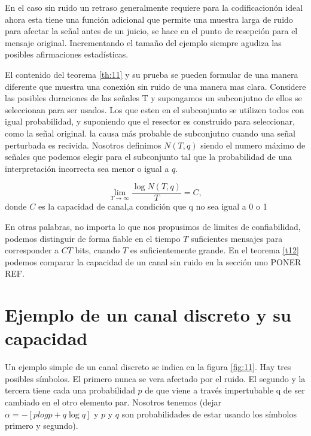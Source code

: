En el caso sin ruido un retraso generalmente requiere para la
codificacion\'on ideal ahora esta tiene una funci\'on adicional que
permite una muestra larga de ruido para afectar la se\~{n}al antes de
un juicio, se hace en el punto de resepci\'on para el mensaje
original. Incrementando el tama\~{n}o del ejemplo siempre agudiza las
posibles afirmaciones estad\'isticas.

El contenido del teorema \ref{th:11} y su prueba se pueden formular de
una manera diferente que muestra una conexi\'on sin ruido de una
manera mas clara. Considere las posibles duraciones de las se\~{n}ales
T y supongamos un subconjutno de ellos se seleccionan para ser
usados. Los que esten en el subconjunto se utilizen todos con igual
probabilidad, y suponiendo que el resector es construido para
seleccionar, como la se\~{n}al original. la causa m\'as probable de
subconjutno cuando una se\~{n}al perturbada es recivida. Nosotros
definimos $N(T,q)$ siendo el numero m\'aximo de se\~{n}ales que
podemos elegir para el subconjunto tal que la probabilidad de una
interpretaci\'{o}n incorrecta sea menor o igual a $q$.

\begin{theorem}
\label{th:12}
  \begin{equation} \lim_{T \to{} \infty}\frac{\log{N}(T,q)}{T} =
    C, \end{equation} donde $C$ es la capacidad de canal,a condici\'on
    que q no sea igual a 0 o 1
\end{theorem}

En otras palabras, no importa lo que nos propusimos de limites de
confiabilidad, podemos distinguir de forma fiable en el tiempo $T$
suficientes mensajes para corresponder a $CT$ bits, cuando $T$ es
suficientemente grande. En el teorema \ref{t12} podemos comparar la
capacidad de un canal sin ruido en la secci\'on uno PONER REF.

\clearpage

\chapter{Ejemplo de un canal discreto y su capacidad}
\label{sec:15}

Un ejemplo simple de un canal discreto se indica en la
figura \ref{fig:11}. Hay tres posibles s\'imbolos. El primero nunca se
vera afectado por el ruido. El segundo y la tercera tiene cada una
probabilidad $p$ de que viene a trav\'es impertubable q de ser
cambiado en el otro elemento par. Nosotros tenemos (dejar $\alpha =
-[plogp + q\log{q}]$ y $p$ y $q$ son probabilidades de estar usando
los s\'imbolos primero y segundo).

